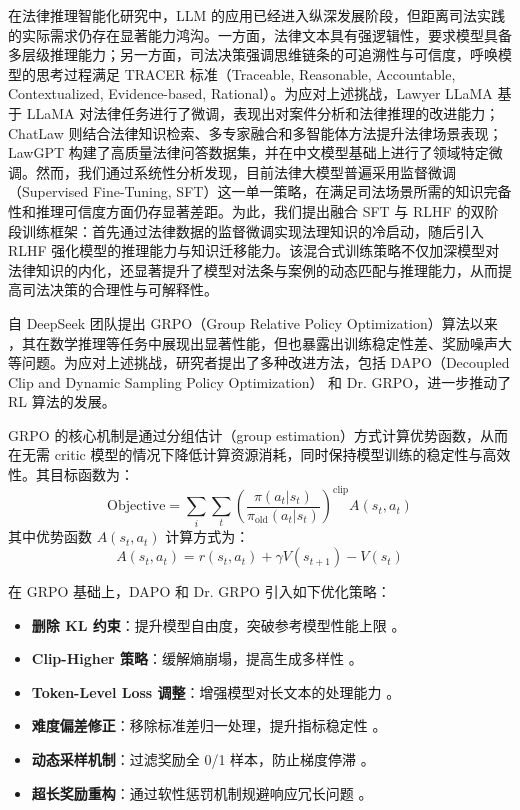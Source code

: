 \documentclass{pkuthesis}
\begin{document}
在法律推理智能化研究中，LLM 的应用已经进入纵深发展阶段，但距离司法实践的实际需求仍存在显著能力鸿沟。一方面，法律文本具有强逻辑性，要求模型具备多层级推理能力；另一方面，司法决策强调思维链条的可追溯性与可信度，呼唤模型的思考过程满足 TRACER 标准（Traceable, Reasonable, Accountable, Contextualized, Evidence-based, Rational）。为应对上述挑战，Lawyer LLaMA\cite{huang2023lawyer} 基于 LLaMA 对法律任务进行了微调，表现出对案件分析和法律推理的改进能力；ChatLaw\cite{cui2023chatlaw} 则结合法律知识检索、多专家融合和多智能体方法提升法律场景表现；LawGPT\cite{zhou2024lawgpt} 构建了高质量法律问答数据集，并在中文模型基础上进行了领域特定微调。然而，我们通过系统性分析发现，目前法律大模型普遍采用监督微调（Supervised Fine-Tuning, SFT）这一单一策略，在满足司法场景所需的知识完备性和推理可信度方面仍存显著差距。为此，我们提出融合 SFT 与 RLHF 的双阶段训练框架：首先通过法律数据的监督微调实现法理知识的冷启动，随后引入 RLHF 强化模型的推理能力与知识迁移能力。该混合式训练策略不仅加深模型对法律知识的内化，还显著提升了模型对法条与案例的动态匹配与推理能力，从而提高司法决策的合理性与可解释性。

自 DeepSeek 团队提出 GRPO（Group Relative Policy Optimization）算法以来 \cite{shao2024deepseekmath}，其在数学推理等任务中展现出显著性能，但也暴露出训练稳定性差、奖励噪声大等问题。为应对上述挑战，研究者提出了多种改进方法，包括 DAPO（Decoupled Clip and Dynamic Sampling Policy Optimization）\cite{yu2025dapo} 和 Dr. GRPO\cite{liu2025understanding}，进一步推动了 RL 算法的发展。

GRPO 的核心机制是通过分组估计（group estimation）方式计算优势函数，从而在无需 critic 模型的情况下降低计算资源消耗，同时保持模型训练的稳定性与高效性。其目标函数为：
\begin{equation}
\text{Objective} = \sum_{i} \sum_{t} \left( \frac{\pi(a_t|s_t)}{\pi_{\text{old}}(a_t|s_t)} \right)^{\text{clip}} A(s_t, a_t)
\end{equation}
其中优势函数 \( A(s_t, a_t) \) 计算方式为：
\begin{equation}
A(s_t, a_t) = r(s_t, a_t) + \gamma V(s_{t+1}) - V(s_t)
\end{equation}

在 GRPO 基础上，DAPO 和 Dr. GRPO 引入如下优化策略：
\begin{itemize}
    \item \textbf{删除 KL 约束}：提升模型自由度，突破参考模型性能上限 \cite{yu2025dapo}。
    \item \textbf{Clip-Higher 策略}：缓解熵崩塌，提高生成多样性 \cite{yu2025dapo}。
    \item \textbf{Token-Level Loss 调整}：增强模型对长文本的处理能力 \cite{yu2025dapo}。
    \item \textbf{难度偏差修正}：移除标准差归一处理，提升指标稳定性 \cite{liu2025understanding}。
    \item \textbf{动态采样机制}：过滤奖励全 0/1 样本，防止梯度停滞 \cite{yu2025dapo}。
    \item \textbf{超长奖励重构}：通过软性惩罚机制规避响应冗长问题 \cite{yu2025dapo}。
\end{itemize}
\end{document}
